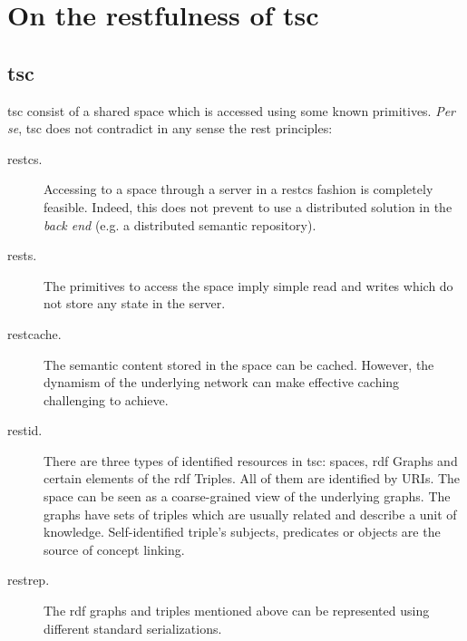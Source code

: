 
\section{On the \acs{rest}fulness of \acs{tsc}}
\label{sec:tsc_restfulness}

\subsection{\acl{tsc}}
\label{sec:tsc_vs_rest}

\ac{tsc} consist of a shared space which is accessed using some known primitives.
\emph{Per se}, \ac{tsc} does not contradict in any sense the \ac{rest} principles:

\begin{description}
 \item[\ac{restcs}.] Accessing to a space through a server in a \ac{restcs} fashion is completely feasible.
		      Indeed, this does not prevent to use a distributed solution in the \emph{back end} (e.g. a distributed semantic repository).
 \item[\ac{rests}.] The primitives to access the space imply simple read and writes which do not store any state in the server.
 \item[\ac{restcache}. ] The semantic content stored in the space can be cached.
                          However, the dynamism of the underlying network can make effective caching challenging to achieve. %
	\item[\ac{restid}.] There are three types of identified resources in \ac{tsc}: spaces, \ac{rdf} Graphs and certain elements of the \ac{rdf} Triples.
	                 All of them are identified by URIs.
	                 The space can be seen as a coarse-grained view of the underlying graphs.
	                 The graphs have sets of triples which are usually related and describe a unit of knowledge. %
	                 Self-identified triple's subjects, predicates or objects are the source of concept linking.
	\item[\ac{restrep}.] The \ac{rdf} graphs and triples mentioned above can be represented using different standard serializations.

\end{description}
